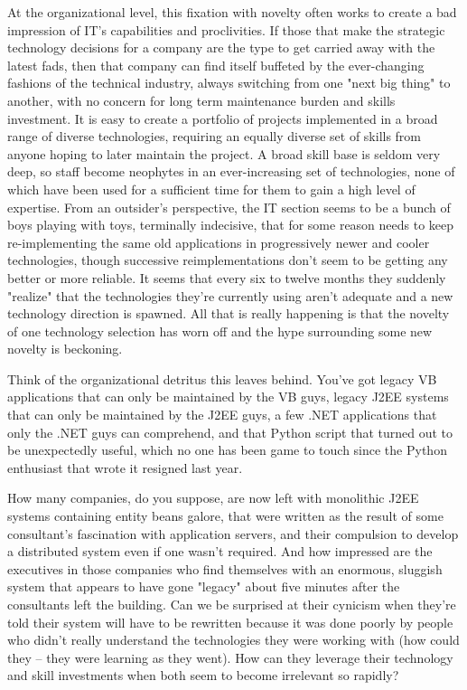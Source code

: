 \documentclass{article}
\begin{document}
\begin{enumerate}
At the organizational level, this fixation with novelty often works to
create a bad impression of IT's capabilities and proclivities. If those
that make the strategic technology decisions for a company are the type
to get carried away with the latest fads, then that company can find
itself buffeted by the ever-changing fashions of the technical industry,
always switching from one "next big thing" to another, with no concern
for long term maintenance burden and skills investment. It is easy to
create a portfolio of projects implemented in a broad range of diverse
technologies, requiring an equally diverse set of skills from anyone
hoping to later maintain the project. A broad skill base is seldom very
deep, so staff become neophytes in an ever-increasing set of
technologies, none of which have been used for a sufficient time for
them to gain a high level of expertise. From an outsider's perspective,
the IT section seems to be a bunch of boys playing with toys, terminally
indecisive, that for some reason needs to keep re-implementing the same
old applications in progressively newer and cooler technologies, though
successive reimplementations don't seem to be getting any better or more
reliable. It seems that every six to twelve months they suddenly
"realize" that the technologies they're currently using aren't adequate
and a new technology direction is spawned. All that is really happening
is that the novelty of one technology selection has worn off and the
hype surrounding some new novelty is beckoning.

Think of the organizational detritus this leaves behind. You've got
legacy VB applications that can only be maintained by the VB guys,
legacy J2EE systems that can only be maintained by the J2EE guys, a few
.NET applications that only the .NET guys can comprehend, and that
Python script that turned out to be unexpectedly useful, which no one
has been game to touch since the Python enthusiast that wrote it
resigned last year.

How many companies, do you suppose, are now left with monolithic J2EE
systems containing entity beans galore, that were written as the result
of some consultant's fascination with application servers, and their
compulsion to develop a distributed system even if one wasn't required.
And how impressed are the executives in those companies who find
themselves with an enormous, sluggish system that appears to have gone
"legacy" about five minutes after the consultants left the building. Can
we be surprised at their cynicism when they're told their system will
have to be rewritten because it was done poorly by people who didn't
really understand the technologies they were working with (how could
they -- they were learning as they went). How can they leverage their
technology and skill investments when both seem to become irrelevant so
rapidly?


\end{enumerate}
\end{document}
